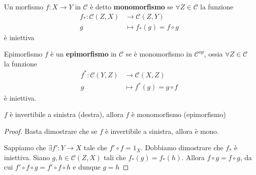 \begin{definition}{}
    Un morfismo \(f : X \to Y\) in \(\mathcal{C}\) è detto \textbf{monomorfismo} se \(\forall Z \in \mathcal{C}\) la funzione 
    \begin{align*}
        f_*: \mathcal{C}{(Z, X)} &\longrightarrow \mathcal{C}{(Z, Y)} \\
        g &\longmapsto f_*(g) = f \circ g
    \end{align*}
    è iniettiva
\end{definition}
\begin{definition}{Epimorfismo}
    \(f\) è un \textbf{epimorfismo} in \(\mathcal{C}\) se è monomorfismo in \(\mathcal{C}^{op}\),
    ossia \(\forall Z \in \mathcal{C}\) la funzione
    \begin{align*}
        f^*: \mathcal{C}{(Y, Z)} &\longrightarrow \mathcal{C}{(X, Z)} \\
        g &\longmapsto f^*(g) = g \circ f
    \end{align*}
    è iniettiva.
\end{definition}

\begin{proposition}{}
    \(f\) è invertibile a sinistra (destra), allora \(f\) è monomorfismo
    (epimorfismo)
\end{proposition}
\begin{proof}{}
    Basta dimostrare che se \(f\) è invertibile a sinistra, allora è mono.

    Sappiamo che \(\exists f' : Y\to X\) tale che \(f' \circ f = 1_X\). Dobbiamo
    dimostrare che \(f_*\) è iniettiva. Siano \(g, h \in \mathcal{C}{(Z, X)}\) tali che \(f_*{(g)} = f_*{(h)}\). Allora \(f \circ g = f \circ g\), da cui \(f' \circ f \circ g = f' \circ f \circ h\) e dunque \(g = h\) 
\end{proof}

